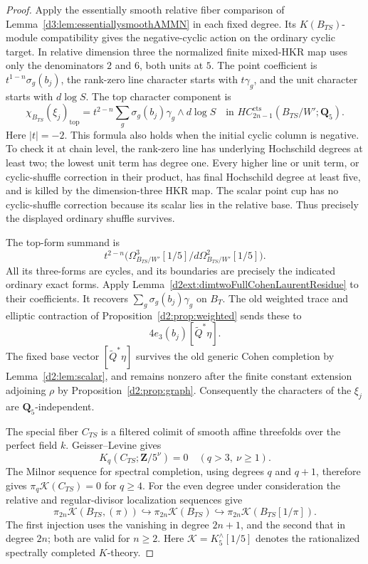 \documentclass[11pt,a4paper]{amsart}
\numberwithin{equation}{section}
\theoremstyle{definition}
\theoremstyle{remark}
\begin{document}
\begin{proof}
Apply the essentially smooth relative fiber comparison of
Lemma~\ref{d3:lem:essentiallysmoothAMMN} in each fixed degree.
Its $K(B_{TS})$-module compatibility gives the negative-cyclic
action on the ordinary cyclic target.  In relative dimension
three the normalized finite mixed-HKR map uses only the
denominators $2$ and $6$, both units at $5$.
The point coefficient is $t^{1-n}\sigma_g(b_j)$, the rank-zero
line character starts with $t\gamma_g$, and the unit character
starts with $d\log S$. The top character component is
\[
 \chi_{B_{TS}}(\xi_j)_{\mathrm{top}}
    =t^{2-n}\sum_g\sigma_g(b_j)\gamma_g\wedge d\log S
       \quad\text{in }HC^{\mathrm{cts}}_{2n-1}(B_{TS}/W';
                                                    \mathbf Q_5).
\]
Here $|t|=-2$.  This formula also holds when the initial cyclic
column is negative.  To check it at chain level, the rank-zero
line has underlying Hochschild degrees at least two; the
lowest unit term has degree one.  Every higher line or unit
term, or cyclic-shuffle correction in their product, has final
Hochschild degree at least five, and is killed by the
dimension-three HKR map.  The scalar point cup has no
cyclic-shuffle correction because its scalar lies in the
relative base.  Thus precisely the displayed ordinary
shuffle survives.

The top-form summand is
\[
 t^{2-n}\bigl(
 \Omega^3_{B_{TS}/W'}[1/5]/
                  d\Omega^2_{B_{TS}/W'}[1/5]\bigr).
\]
All its three-forms are cycles, and its boundaries are precisely
the indicated ordinary exact forms.  Apply
Lemma~\ref{d2ext:dimtwoFullCohenLaurentResidue} to their coefficients.
It recovers
$\sum_g\sigma_g(b_j)\gamma_g$ on $B_T$.
The old weighted trace and elliptic contraction of
Proposition~\ref{d2:prop:weighted} sends these to
\[
 4e_3(b_j)[\widetilde Q^*\eta].
\]
The fixed base vector $[\widetilde Q^*\eta]$ survives the old generic Cohen
completion by Lemma~\ref{d2:lem:scalar}, and remains
nonzero after the finite constant extension adjoining $\rho$ by
Proposition~\ref{d2:prop:graph}.
Consequently the characters of the $\xi_j$ are
$\mathbf Q_5$-independent.

The special fiber $C_{TS}$ is a filtered colimit of smooth
affine threefolds over the perfect field $k$.  Geisser--Levine
\cite[Theorem~8.4]{GeisserLevineCharP} gives
\[
 K_q(C_{TS};\mathbf Z/5^\nu)=0
      \quad(q>3,\ \nu\geq1).
\]
The Milnor sequence for spectral completion, using degrees
$q$ and $q+1$, therefore gives
$\pi_q\mathcal K(C_{TS})=0$ for $q\geq4$.
For the even degree under consideration the relative and
regular-divisor localization sequences give
\[
 \pi_{2n}\mathcal K(B_{TS},(\pi))
   \hookrightarrow\pi_{2n}\mathcal K(B_{TS})
   \hookrightarrow\pi_{2n}\mathcal K(B_{TS}[1/\pi]).
\]
The first injection uses the vanishing in degree $2n+1$,
and the second that in degree $2n$; both are valid for $n\geq2$.
Here $\mathcal K=K^\wedge_5[1/5]$ denotes the rationalized
spectrally completed $K$-theory.


\end{proof}
\end{document}
